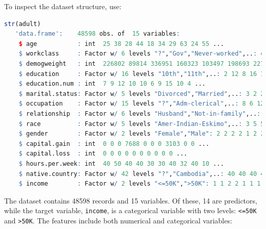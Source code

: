 \documentclass[
]{book}
\newcommand{\passthrough}[1]{#1}
\theoremstyle{definition}
\theoremstyle{definition}
\theoremstyle{definition}
\theoremstyle{definition}
\theoremstyle{remark}
\begin{document}
To inspect the dataset structure, use:

\begin{lstlisting}[language=R]
str(adult)
   'data.frame':    48598 obs. of  15 variables:
    $ age           : int  25 38 28 44 18 34 29 63 24 55 ...
    $ workclass     : Factor w/ 6 levels "?","Gov","Never-worked",..: 4 4 2 4 1 4 1 5 4 4 ...
    $ demogweight   : int  226802 89814 336951 160323 103497 198693 227026 104626 369667 104996 ...
    $ education     : Factor w/ 16 levels "10th","11th",..: 2 12 8 16 16 1 12 15 16 6 ...
    $ education.num : int  7 9 12 10 10 6 9 15 10 4 ...
    $ marital.status: Factor w/ 5 levels "Divorced","Married",..: 3 2 2 2 3 3 3 2 3 2 ...
    $ occupation    : Factor w/ 15 levels "?","Adm-clerical",..: 8 6 12 8 1 9 1 11 9 4 ...
    $ relationship  : Factor w/ 6 levels "Husband","Not-in-family",..: 4 1 1 1 4 2 5 1 5 1 ...
    $ race          : Factor w/ 5 levels "Amer-Indian-Eskimo",..: 3 5 5 3 5 5 3 5 5 5 ...
    $ gender        : Factor w/ 2 levels "Female","Male": 2 2 2 2 1 2 2 2 1 2 ...
    $ capital.gain  : int  0 0 0 7688 0 0 0 3103 0 0 ...
    $ capital.loss  : int  0 0 0 0 0 0 0 0 0 0 ...
    $ hours.per.week: int  40 50 40 40 30 30 40 32 40 10 ...
    $ native.country: Factor w/ 42 levels "?","Cambodia",..: 40 40 40 40 40 40 40 40 40 40 ...
    $ income        : Factor w/ 2 levels "<=50K",">50K": 1 1 2 2 1 1 1 2 1 1 ...
\end{lstlisting}

The dataset contains 48598 records and 15 variables. Of these, 14 are predictors, while the target variable, \passthrough{\lstinline!income!}, is a categorical variable with two levels: \passthrough{\lstinline!<=50K!} and \passthrough{\lstinline!>50K!}. The features include both numerical and categorical variables:
\end{document}
